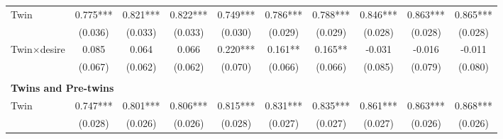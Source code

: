 \begin{landscape}
\begin{table}[htpb!]
\begin{center}
\begin{tabular}{lccccccccc}
Twin&0.775***&0.821***&0.822***&0.749***&0.786***&0.788***&0.846***&0.863***&0.865***\\
&(0.036)&(0.033)&(0.033)&(0.030)&(0.029)&(0.029)&(0.028)&(0.028)&(0.028)\\
Twin$\times$desire&0.085&0.064&0.066&0.220***&0.161**&0.165**&-0.031&-0.016&-0.011\\
&(0.067)&(0.062)&(0.062)&(0.070)&(0.066)&(0.066)&(0.085)&(0.079)&(0.080)\\
\begin{footnotesize}\end{footnotesize}&\begin{footnotesize}\end{footnotesize}&\begin{footnotesize}\end{footnotesize}&\begin{footnotesize}\end{footnotesize}&\begin{footnotesize}\end{footnotesize}&\begin{footnotesize}\end{footnotesize}&\begin{footnotesize}\end{footnotesize}&\begin{footnotesize}\end{footnotesize}&\begin{footnotesize}\end{footnotesize}&\begin{footnotesize}\end{footnotesize}\\\multicolumn{10}{l}{\textbf{Twins and Pre-twins}}\\ 
Twin&0.747***&0.801***&0.806***&0.815***&0.831***&0.835***&0.861***&0.863***&0.868***\\
&(0.028)&(0.026)&(0.026)&(0.028)&(0.027)&(0.027)&(0.027)&(0.026)&(0.026)\\

\end{tabular}
\end{center}
\end{table}
\end{landscape}
